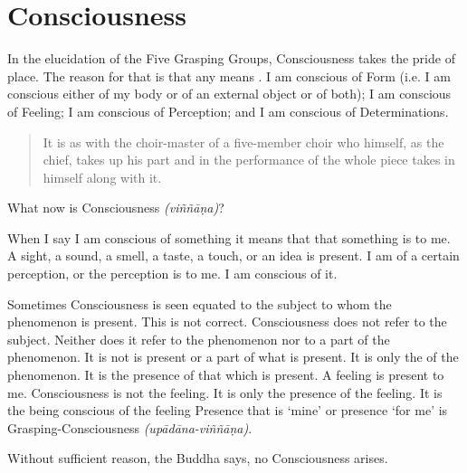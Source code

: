 \chapter{Consciousness}

In the elucidation of the Five Grasping Groups, Consciousness takes the pride of place. The reason for that is that any  means . I am conscious of Form (i.e. I am conscious either of my body or of an external object or of both); I am conscious of Feeling; I am conscious of Perception; and I am conscious of Determinations.

\begin{quote}
It is as with the choir-master of a five-member choir who himself, as the chief, takes up his part and in the performance of the whole piece takes in himself along with it.
\end{quote}

What now is Consciousness \emph{(viññāṇa)}?

When I say I am conscious of something it means that that something is  to me. A sight, a sound, a smell, a taste, a touch, or an idea is present. I am  of a certain perception, or the perception is  to me. I am conscious of it.

Sometimes Consciousness is seen equated to the subject to whom the phenomenon is present. This is not correct. Consciousness does not refer to the subject. Neither does it refer to the phenomenon nor to a part of the phenomenon. It is not  is present or a part of what is present. It is only the  of the phenomenon. It is the presence of that which is present. A feeling is present to me. Consciousness is not the feeling. It is only the presence of the feeling. It is the being conscious of the feeling Presence that is `mine' or presence `for me' is Grasping-Consciousness \emph{(upādāna-viññāṇa)}.

Without sufficient reason, the Buddha says, no Consciousness arises.

